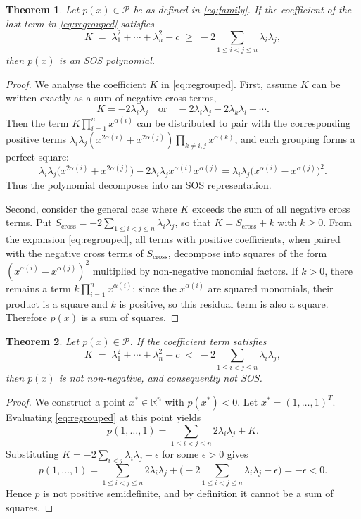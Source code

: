 \documentclass[12pt]{elsarticle}
\newtheorem{theorem}{Theorem}[section]
\theoremstyle{definition}
\begin{document}
\begin{theorem}\label{thm:sufficient}
Let $p(x) \in \mathcal{P}$ be as defined in \eqref{eq:family}. If the coefficient of the last term in \eqref{eq:regrouped} satisfies
\[ K \;=\; \lambda_1^2 + \cdots +\lambda_n^2 - c \;\ge\; -2\!\!\sum_{1\leq i < j\leq n}\!\! \lambda_i\lambda_j, \]
then $p(x)$ is an SOS polynomial.
\end{theorem}

\begin{proof}
We analyse the coefficient $K$ in \eqref{eq:regrouped}. First, assume $K$ can be written exactly as a sum of negative cross terms,
\[
K = -2\lambda_i\lambda_j \quad \text{or} \quad -2\lambda_i\lambda_j - 2\lambda_k\lambda_l - \cdots .
\]
Then the term $K\prod_{i=1}^{n}x^{\alpha(i)}$ can be distributed to pair with the corresponding positive terms $\lambda_i\lambda_j(x^{2\alpha(i)} + x^{2\alpha(j)})\prod_{k\neq i,j}x^{\alpha(k)}$, and each grouping forms a perfect square:
\[
\lambda_i\lambda_j\big(x^{2\alpha(i)} + x^{2\alpha(j)}\big) - 2\lambda_i\lambda_j x^{\alpha(i)}x^{\alpha(j)} = \lambda_i\lambda_j \big(x^{\alpha(i)} - x^{\alpha(j)}\big)^2 .
\]
Thus the polynomial decomposes into an SOS representation.

Second, consider the general case where $K$ exceeds the sum of all negative cross terms. Put $S_{\mathrm{cross}} = -2\sum_{1\leq i < j\leq n} \lambda_i\lambda_j$, so that $K = S_{\mathrm{cross}} + k$ with $k \ge 0$. From the expansion \eqref{eq:regrouped}, all terms with positive coefficients, when paired with the negative cross terms of $S_{\mathrm{cross}}$, decompose into squares of the form $(x^{\alpha(i)} - x^{\alpha(j)})^2$ multiplied by non-negative monomial factors. If $k > 0$, there remains a term $k \prod_{i=1}^n x^{\alpha(i)}$; since the $x^{\alpha(i)}$ are squared monomials, their product is a square and $k$ is positive, so this residual term is also a square. Therefore $p(x)$ is a sum of squares.
\end{proof}

\begin{theorem}\label{thm:necessary}
Let $p(x) \in \mathcal{P}$. If the coefficient term satisfies
\[ K \;=\; \lambda_1^2 + \cdots +\lambda_n^2 - c \;<\; -2\!\!\sum_{1\leq i < j\leq n} \!\!\lambda_i\lambda_j, \]
then $p(x)$ is not non-negative, and consequently not SOS.
\end{theorem}

\begin{proof}
We construct a point $x^* \in \mathbb{R}^n$ with $p(x^*) < 0$. Let $x^* = (1,\dots,1)^T$. Evaluating \eqref{eq:regrouped} at this point yields
\[
p(1,\dots,1) = \sum_{1\leq i < j\leq n} 2\lambda_i\lambda_j + K .
\]
Substituting $K = -2\sum_{i<j}\lambda_i\lambda_j - \epsilon$ for some $\epsilon > 0$ gives
\[
p(1,\dots,1) = \sum_{1\leq i < j\leq n} 2\lambda_i\lambda_j + \Big( -2\!\!\sum_{1\leq i < j\leq n}\!\! \lambda_i\lambda_j - \epsilon \Big) = -\epsilon < 0 .
\]
Hence $p$ is not positive semidefinite, and by definition it cannot be a sum of squares.
\end{proof}
\end{document}

